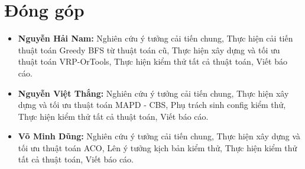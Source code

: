 \documentclass[conference]{IEEEtran}
\begin{document}
\section{Đóng góp}
\begin{itemize}
    \item \textbf{Nguyễn Hải Nam:} Nghiên cứu ý tưởng cải tiến chung, Thực hiện cải tiến thuật toán Greedy BFS từ thuật toán cũ, Thực hiện xây dựng và tối ưu thuật toán VRP-OrTools, Thực hiện kiểm thử tất cả thuật toán, Viết báo cáo.
    \item \textbf{Nguyễn Việt Thắng:} Nghiên cứu ý tưởng cải tiến chung, Thực hiện xây dựng và tối ưu thuật toán MAPD - CBS, Phụ trách sinh config kiểm thử, Thực hiện kiểm thử tất cả thuật toán, Viết báo cáo.
    \item \textbf{Võ Minh Dũng:} Nghiên cứu ý tưởng cải tiến chung, Thực hiện xây dựng và tối ưu thuật toán ACO, Lên ý tưởng kịch bản kiểm thử, Thực hiện kiểm thử tất cả thuật toán, Viết báo cáo.
\end{itemize}
\end{document}
